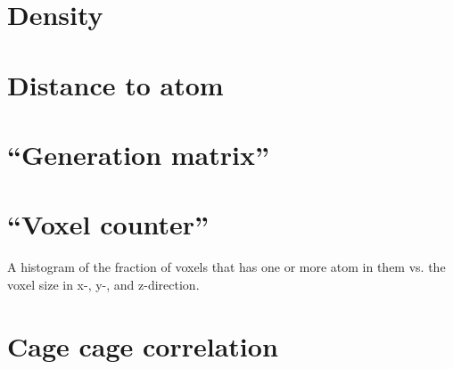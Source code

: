     \section{Density}
    \section{Distance to atom}
    \section{``Generation matrix''}
    \section{``Voxel counter''}
        A histogram of the fraction of voxels that has one or more atom in them vs. the voxel size in x-, y-, and z-direction.
    \section{Cage cage correlation}
    \section{}